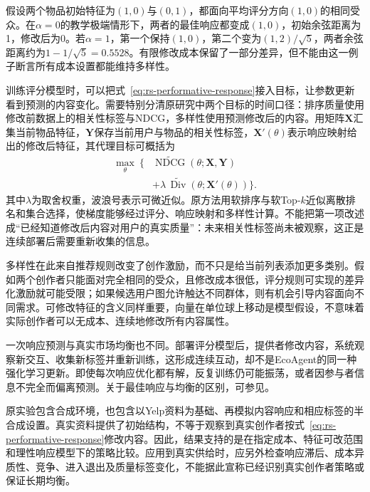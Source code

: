 假设两个物品初始特征为$(1,0)$与$(0,1)$，都面向平均评分方向$(1,0)$的相同受众。在$\alpha=0$的教学极端情形下，两者的最佳响应都变成$(1,0)$，初始余弦距离为1，修改后为0。若$\alpha=1$，第一个保持$(1,0)$，第二个变为$(1,2)/\sqrt5$，两者余弦距离约为$1-1/\sqrt5=0.5528$。有限修改成本保留了一部分差异，但不能由这一例子断言所有成本设置都能维持多样性。

训练评分模型时，可以把式~\eqref{eq:rs-performative-response}接入目标，让参数更新看到预测的内容变化。需要特别分清原研究中两个目标的时间口径：排序质量使用修改前数据上的相关性标签与NDCG，多样性使用预测修改后的内容。用矩阵$\bm{X}$汇集当前物品特征，$\bm{Y}$保存当前用户与物品的相关性标签，$\bm{X}'(\theta)$表示响应映射给出的修改后特征，其代理目标可概括为
\begin{equation}
 \begin{aligned}
 \max_\theta\ \bigl\{&
 \widetilde{\operatorname{NDCG}}(\theta;\bm{X},\bm{Y})\\
 &+\lambda\,\widetilde{\operatorname{Div}}
       (\theta;\bm{X}'(\theta))\bigr\}.
 \end{aligned}
 \label{eq:rs-performative-learning}
\end{equation}
其中$\lambda$为取舍权重，波浪号表示可微近似。原方法用软排序与软Top-$k$近似离散排名和集合选择，使梯度能够经过评分、响应映射和多样性计算。不能把第一项改述成“已经知道修改后内容对用户的真实质量”：未来相关性标签尚未被观察，这正是连续部署后需要重新收集的信息。

多样性在此来自推荐规则改变了创作激励，而不只是给当前列表添加更多类别。假如两个创作者只能面对完全相同的受众，且修改成本很低，评分规则可实现的差异化激励就可能受限；如果候选用户图允许触达不同群体，则有机会引导内容面向不同需求。可修改特征的含义同样重要，向量在单位球上移动是模型假设，不意味着实际创作者可以无成本、连续地修改所有内容属性。

一次响应预测与真实市场均衡也不同。部署评分模型后，提供者修改内容，系统观察新交互、收集新标签并重新训练，这形成连续互动，却不是EcoAgent的同一种强化学习更新。即使每次响应优化都有解，反复训练仍可能振荡，或者因参与者信息不完全而偏离预测。关于最佳响应与均衡的区别，可参见。

原实验包含合成环境，也包含以Yelp资料为基础、再模拟内容响应和相应标签的半合成设置。真实资料提供了初始结构，不等于观察到真实创作者按式~\eqref{eq:rs-performative-response}修改内容。因此，结果支持的是在指定成本、特征可改范围和理性响应模型下的策略比较。应用到真实供给时，应另外检查响应滞后、成本异质性、竞争、进入退出及质量标签变化，不能据此宣称已经识别真实创作者策略或保证长期均衡。

